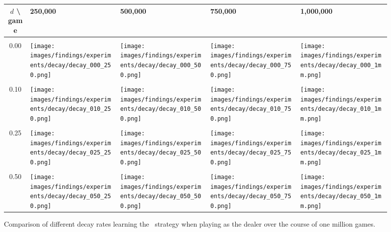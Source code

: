 \begin{figure}[h]
	\centering

	\begin{tabular}{c | l l l l}
		$d$ \textbf{\textbackslash} game & 250,000 & 500,000 & 750,000 & 1,000,000 \\
		\hline
		\\
		0.00 &
			\parbox[c]{5em}{\texttt{[image: images/findings/experiments/decay/decay\_000\_250.png]}} & %
			\parbox[c]{5em}{\texttt{[image: images/findings/experiments/decay/decay\_000\_500.png]}} & %
			\parbox[c]{5em}{\texttt{[image: images/findings/experiments/decay/decay\_000\_750.png]}} & %
			\parbox[c]{5em}{\texttt{[image: images/findings/experiments/decay/decay\_000\_1mm.png]}} \\ %
		\\
		0.10 & 
			\parbox[c]{5em}{\texttt{[image: images/findings/experiments/decay/decay\_010\_250.png]}} & %
			\parbox[c]{5em}{\texttt{[image: images/findings/experiments/decay/decay\_010\_500.png]}} & %
			\parbox[c]{5em}{\texttt{[image: images/findings/experiments/decay/decay\_010\_750.png]}} & %
			\parbox[c]{5em}{\texttt{[image: images/findings/experiments/decay/decay\_010\_1mm.png]}} \\ %
		\\
		0.25 & 
			\parbox[c]{5em}{\texttt{[image: images/findings/experiments/decay/decay\_025\_250.png]}} & %
			\parbox[c]{5em}{\texttt{[image: images/findings/experiments/decay/decay\_025\_500.png]}} & %
			\parbox[c]{5em}{\texttt{[image: images/findings/experiments/decay/decay\_025\_750.png]}} & %
			\parbox[c]{5em}{\texttt{[image: images/findings/experiments/decay/decay\_025\_1mm.png]}} \\ %
		\\
		0.50 & 
			\parbox[c]{5em}{\texttt{[image: images/findings/experiments/decay/decay\_050\_250.png]}} & %
			\parbox[c]{5em}{\texttt{[image: images/findings/experiments/decay/decay\_050\_500.png]}} & %
			\parbox[c]{5em}{\texttt{[image: images/findings/experiments/decay/decay\_050\_750.png]}} & %
			\parbox[c]{5em}{\texttt{[image: images/findings/experiments/decay/decay\_050\_1mm.png]}} \\ %
	\end{tabular}

\caption{
	Comparison of different decay rates learning the \handmaxavg\ strategy
	when playing as the dealer
	over the course of one million games.
	}
\label{fig:expts-decay-comp}
\end{figure}
